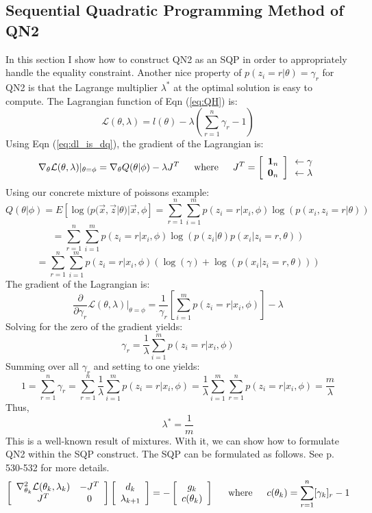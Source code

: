\documentclass[letter,12pt]{article}
\begin{document}
\subsection{Sequential Quadratic Programming Method of QN2}

In this section I show how to construct QN2 as an SQP in order to appropriately handle the equality constraint.  Another nice property of $p(z_i=r|\theta)=\gamma_r$ for QN2 is that the Lagrange multiplier $\lambda^*$ at the optimal solution is easy to compute.  The Lagrangian function of Eqn (\ref{eq:QH}) is:
\[
\mathcal{L}(\theta,\lambda) = l(\theta) - \lambda(\sum_{r=1}^{n}\gamma_r - 1)
\]
Using Eqn (\ref{eq:dl_is_dq}), the gradient of the Lagrangian is:
\[
\nabla_{\theta}\mathcal{L}(\theta,\lambda)|_{\theta=\phi}
= \nabla_{\theta}Q(\theta|\phi) - \lambda J^T
\indent
\text{where}
\indent
J^T =
\left[
\begin{array}{c}
\boldsymbol{1}_n
\\
\boldsymbol{0}_n
\end{array}
\right]
\begin{array}{c}
\leftarrow\gamma
\\
\leftarrow\lambda
\end{array}
\]
Using our concrete mixture of poissons example:
\[
Q(\theta|\phi) = E[\log(p(\vec{x},\vec{z}|\theta)|\vec{x},\phi]
=
\sum_{r=1}^{n}\sum_{i=1}^{m}p(z_i=r|x_i,\phi)\log(p(x_i,z_i=r|\theta))
\]
\[
=\sum_{r=1}^{n}\sum_{i=1}^{m}p(z_i=r|x_i,\phi)
\log(p(z_i|\theta)p(x_i|z_i=r,\theta))
\]
\[
=\sum_{r=1}^{n}\sum_{i=1}^{m}p(z_i=r|x_i,\phi)
\left(
\log(\gamma) + \log(p(x_i|z_i=r,\theta))\right)
\]
The gradient of the Lagrangian is:
\[
\frac{\partial}{\partial \gamma_r}\mathcal{L}(\theta,\lambda)|_{\theta=\phi}
=
\frac{1}{\gamma_r}\left[\sum_{i=1}^{m}p(z_i=r|x_i,\phi)
\right]-\lambda
\]
Solving for the zero of the gradient yields:
\[
\gamma_r
=
\frac{1}{\lambda}\sum_{i=1}^{m}p(z_i=r|x_i,\phi)
\]
Summing over all $\gamma_r$ and setting to one yields:
\[
1 = \sum_{r=1}^{n}\gamma_r = 
\sum_{r=1}^{n}\frac{1}{\lambda}\sum_{i=1}^{m}p(z_i=r|x_i,\phi)
=
\frac{1}{\lambda}\sum_{i=1}^{m}\sum_{r=1}^{n}p(z_i=r|x_i,\phi)
= \frac{m}{\lambda}
\]
Thus,
\[
\lambda^* = \frac{1}{m}
\]
This is a well-known result of mixtures.  With it, we can show how to formulate QN2 within the SQP construct. The SQP can be formulated as follows.  See \cite{nocedalwright} p. 530-532 for more details.
\[
\left[
\begin{array}{cc}
\nabla^2_{\theta_k}\mathcal{L}(\theta_k,\lambda_k) & -J^T
\\
J^T & 0
\end{array}
\right]
\left[
\begin{array}{cc}
d_k
\\
\lambda_{k+1}
\end{array}
\right]
=
-
\left[
\begin{array}{c}
g_k
\\
c(\theta_k)
\end{array}
\right]
\indent
\text{where}
\indent
c(\theta_k) = \sum_{r=1}^{n}[\gamma_k]_r - 1
\]
\end{document}
